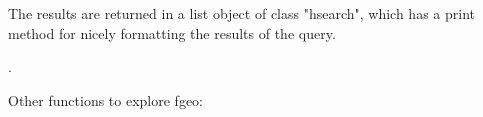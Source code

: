 \documentclass[a4paper]{book}
\begin{document}
%
\begin{Value}
The results are returned in a list object of class "hsearch", which
has a print method for nicely formatting the results of the query.
\end{Value}
%
\begin{SeeAlso}\relax
{}.

Other functions to explore fgeo: 
\end{SeeAlso}
%
\begin{Examples}
\end{Examples}
\printindex{}
\end{document}
